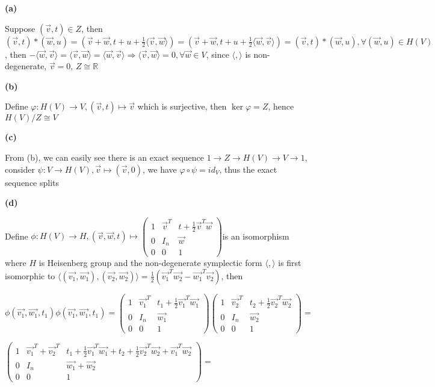 \documentclass[main]{subfiles}
\newcommand{\<}[1]{\langle #1 \rangle}
\begin{document}
\textbf{(a)} \par
Suppose $(\vec{v},t)\in Z$, then $(\vec{v},t)*(\vec{w},u)=(\vec{v}+\vec{w},t+u+\frac{1}{2}\<{\vec{v},\vec{w}})=(\vec{v}+\vec{w},t+u+\frac{1}{2}\<{\vec{w},\vec{v}})=(\vec{v},t)*(\vec{w},u), \forall (\vec{w},u)\in H(V)$, then $-\<{\vec{w},\vec{v}}=\<{\vec{v},\vec{w}}=\<{\vec{w},\vec{v}}\Rightarrow \<{\vec{v},\vec{w}}=0, \forall \vec{w}\in V$, since $\<{,}$ is non-degenerate, $\vec{v}=0$, $Z\cong\mathbb R$\par
\textbf{(b)} \par
Define $\varphi: H(V)\rightarrow V, (\vec{v},t)\mapsto\vec{v}$ which is surjective, then $\ker\varphi=Z$, hence $H(V)/Z\cong V$ \par
\textbf{(c)} \par
From (b), we can easily see there is an exact sequence $1\rightarrow Z\rightarrow H(V)\rightarrow V\rightarrow 1$, consider $\psi:V\rightarrow H(V), \vec{v}\mapsto(\vec{v},0)$, we have $\varphi\circ\psi=id_V$, thus the exact sequence splits \par
\textbf{(d)} \par
Define $\phi:H(V)\rightarrow H, (\vec{v},\vec{w},t)\mapsto\left( {\begin{array}{ccc}
1 & \vec{v}^T & t+\frac{1}{2}\vec{v}^T\vec{w} \\
0 & I_{n}& \vec{w} \\
0 & 0 & 1
\end{array} } \right)$is an isomorphism where $H$ is Heisenberg group and the non-degenerate symplectic form $\<{,}$ is first isomorphic to $\<{(\vec{v_1},\vec{w_1}),(\vec{v_2},\vec{w_2})}=\frac{1}{2}(\vec{v_1}^T\vec{w_2}-\vec{w_1}^T\vec{v_2})$, then \par
$\phi(\vec{v_1},\vec{w_1},t_1)\phi(\vec{v_1},\vec{w_1},t_1)=\left( {\begin{array}{ccc}
1 & \vec{v_1}^T & t_1+\frac{1}{2}\vec{v_1}^T\vec{w_1} \\
0 & I_{n}& \vec{w_1} \\
0 & 0 & 1
\end{array} } \right)\left( {\begin{array}{ccc}
1 & \vec{v_2}^T & t_2+\frac{1}{2}\vec{v_2}^T\vec{w_2} \\
0 & I_{n}& \vec{w_2} \\
0 & 0 & 1
\end{array} } \right)=$\par
$\left( {\begin{array}{ccc}
1 & \vec{v_1}^T+\vec{v_2}^T & t_1+\frac{1}{2}\vec{v_1}^T\vec{w_1}+ t_2+\frac{1}{2}\vec{v_2}^T\vec{w_2}+\vec{v_1}^T\vec{w_2} \\
0 & I_{n}& \vec{w_1}+\vec{w_2} \\
0 & 0 & 1
\end{array} } \right)=$\par
\end{document}
